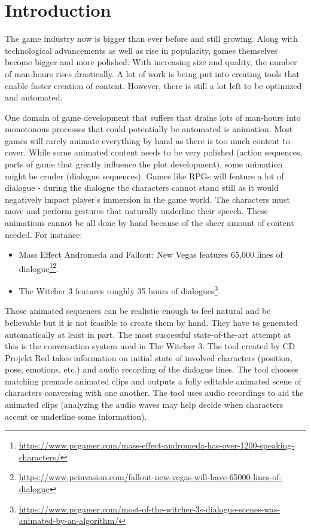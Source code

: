 \chapter{Introduction\label{chap:introduction}}

The game industry now is bigger than ever before and still growing. Along with technological advancements as well as rise in popularity, games themselves become bigger and more polished. With increasing size and quality, the number of man-hours rises drastically. A lot of work is being put into creating tools that enable faster creation of content. However, there is still a lot left to be optimized and automated.

One domain of game development that suffers that drains lots of man-hours into monotonous processes that could potentially be automated is animation. Most games will rarely animate everything by hand as there is too much content to cover. While some animated content needs to be very polished (action sequences, parts of game that greatly influence the plot development), some animation might be cruder (dialogue sequences). Games like RPGs will feature a lot of dialogue - during the dialogue the characters cannot stand still as it would negatively impact player's immersion in the game world. The characters must move and perform gestures that naturally underline their speech. These animations cannot be all done by hand because of the sheer amount of content needed. For instance:

\begin{itemize}
\item Mass Effect Andromeda and Fallout:  New Vegas features 65,000 lines of dialogue\footnote{\url{https://www.pcgamer.com/mass-effect-andromeda-has-over-1200-speaking-characters/}}\footnote{\url{https://www.pcinvasion.com/fallout-new-vegas-will-have-65000-lines-of-dialogue}}.

\item The Witcher 3 features roughly 35 hours of dialogues\footnote{\url{https://www.pcgamer.com/most-of-the-witcher-3s-dialogue-scenes-was-animated-by-an-algorithm/}}.

\end{itemize}

Those animated sequences can be realistic enough to feel natural and be believable but it is not feasible to create them by hand. They have to generated automatically at least in part. The most successful state-of-the-art attempt at this is the conversation system used in The Witcher 3. The tool created by CD Projekt Red takes information on initial state of involved characters (position, pose, emotions, etc.) and audio recording of the dialogue lines. The tool chooses matching premade animated clips and outputs a fully editable animated scene of characters conversing with one another. The tool uses audio recordings to aid the animated clips (analyzing the audio waves may help decide when characters accent or underline some information).

